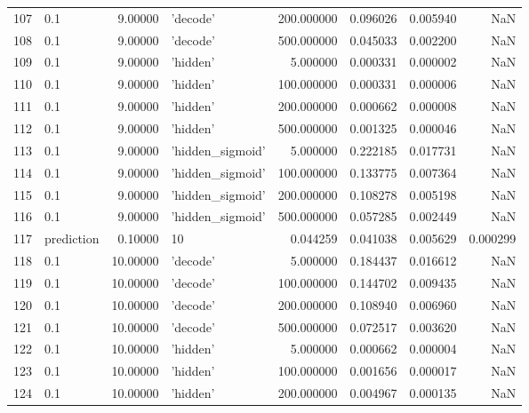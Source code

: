 \documentclass[10pt,a4paper]{article}
\begin{document}
\begin{tabular}{llrlrrrr}
107  &         0.1 &   9.00000 &           'decode' &  200.000000 &  0.096026 &  0.005940 &       NaN \\
108  &         0.1 &   9.00000 &           'decode' &  500.000000 &  0.045033 &  0.002200 &       NaN \\
109  &         0.1 &   9.00000 &           'hidden' &    5.000000 &  0.000331 &  0.000002 &       NaN \\
110  &         0.1 &   9.00000 &           'hidden' &  100.000000 &  0.000331 &  0.000006 &       NaN \\
111  &         0.1 &   9.00000 &           'hidden' &  200.000000 &  0.000662 &  0.000008 &       NaN \\
112  &         0.1 &   9.00000 &           'hidden' &  500.000000 &  0.001325 &  0.000046 &       NaN \\
113  &         0.1 &   9.00000 &   'hidden\_sigmoid' &    5.000000 &  0.222185 &  0.017731 &       NaN \\
114  &         0.1 &   9.00000 &   'hidden\_sigmoid' &  100.000000 &  0.133775 &  0.007364 &       NaN \\
115  &         0.1 &   9.00000 &   'hidden\_sigmoid' &  200.000000 &  0.108278 &  0.005198 &       NaN \\
116  &         0.1 &   9.00000 &   'hidden\_sigmoid' &  500.000000 &  0.057285 &  0.002449 &       NaN \\
117  &  prediction &   0.10000 &                 10 &    0.044259 &  0.041038 &  0.005629 &  0.000299 \\
118  &         0.1 &  10.00000 &           'decode' &    5.000000 &  0.184437 &  0.016612 &       NaN \\
119  &         0.1 &  10.00000 &           'decode' &  100.000000 &  0.144702 &  0.009435 &       NaN \\
120  &         0.1 &  10.00000 &           'decode' &  200.000000 &  0.108940 &  0.006960 &       NaN \\
121  &         0.1 &  10.00000 &           'decode' &  500.000000 &  0.072517 &  0.003620 &       NaN \\
122  &         0.1 &  10.00000 &           'hidden' &    5.000000 &  0.000662 &  0.000004 &       NaN \\
123  &         0.1 &  10.00000 &           'hidden' &  100.000000 &  0.001656 &  0.000017 &       NaN \\
124  &         0.1 &  10.00000 &           'hidden' &  200.000000 &  0.004967 &  0.000135 &       NaN \\

\end{tabular}
\end{document}
